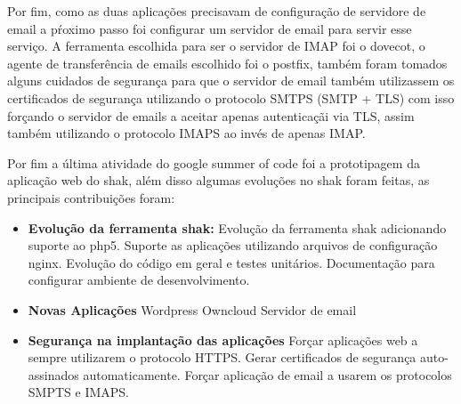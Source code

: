Por fim, como as duas aplicações precisavam de configuração de servidore de email
a pŕoximo passo foi configurar um servidor de email para servir esse serviço. A
ferramenta escolhida para ser o servidor de IMAP foi o dovecot, o agente de
transferência de emails escolhido foi o postfix, também foram tomados alguns
 cuidados de segurança para que o servidor de email também utilizassem os certificados
 de segurança utilizando o protocolo SMTPS (SMTP + TLS) com isso forçando o servidor
 de emails a aceitar apenas autenticaçãi via TLS, assim também utilizando o
 protocolo IMAPS ao invés de apenas IMAP.

Por fim a última atividade do google summer of code foi a prototipagem da aplicação
web do shak, além disso algumas evoluções no shak foram feitas, as principais
contribuições foram:

\begin{itemize}
  \item  \textbf{Evolução da ferramenta shak:}
  \subitem Evolução da ferramenta shak adicionando suporte ao php5.
  \subitem Suporte as aplicações utilizando arquivos de configuração nginx.
  \subitem Evolução do código em geral e testes unitários.
  \subitem Documentação para configurar ambiente de desenvolvimento.

  \item  \textbf{Novas Aplicações}
  \subitem Wordpress
  \subitem Owncloud
  \subitem Servidor de email

  \item  \textbf{Segurança na implantação das aplicações}
  \subitem Forçar aplicações web a sempre utilizarem o protocolo HTTPS.
  \subitem Gerar certificados de segurança auto-assinados automaticamente.
  \subitem Forçar aplicação de email a usarem os protocolos SMPTS e IMAPS.
\end{itemize}


%
